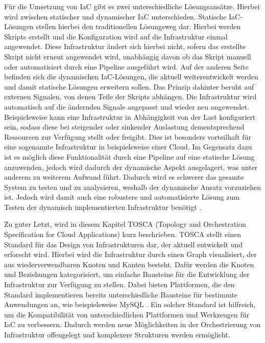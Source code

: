 \documentclass[biblatex]{lni}
\begin{document}
Für die Umsetzung von IaC gibt es zwei unterschiedliche Lösungsansätze. Hierbei wird zwischen statischer und dynamischer IaC unterschieden. Statische IaC-Lösungen stellen hierbei den traditionellen Lösungsweg dar. Hierbei werden Skripts erstellt und die Konfiguration wird auf die Infrastruktur einmal angewendet. Diese Infrastruktur ändert sich hierbei nicht, sofern das erstellte Skript nicht erneut angewendet wird, unabhängig davon ob das Skript manuell oder automatisiert durch eine Pipeline ausgeführt wird. Auf der anderen Seite befinden sich die dynamischen IaC-Lösungen, die aktuell weiterentwickelt werden und damit statische Lösungen erweitern sollen. Das Prinzip dahinter beruht auf externen Signalen, von denen Teile der Skripts abhängen. Die Infrastruktur wird automatisch auf die ändernden Signale angepasst und wieder neu angewendet. Beispielsweise kann eine Infrastruktur in Abhängigkeit von der Last konfiguriert sein, sodass diese bei steigender oder sinkender Auslastung dementsprechend Ressourcen zur Verfügung stellt oder freigibt. Dies ist besonders vorteilhaft für eine sogenannte  Infrastruktur in beispielsweise einer Cloud. Im Gegensatz dazu ist es möglich diese Funktionalität durch eine Pipeline auf eine statische Lösung anzuwenden, jedoch wird dadurch der dynamische Aspekt ausgelagert, was unter anderem zu weiterem Aufwand führt. Dadurch wird es schwerer das gesamte System zu testen und zu analysieren, weshalb der dynamische Ansatz vorzuziehen ist. Jedoch wird damit auch eine robustere und automatisierte Lösung zum Testen der dynamisch implementierten Infrastruktur benötigt \cite{Sokolowski.2022}.

Zu guter Letzt, wird in diesem Kapitel TOSCA (Topology and Orchestration Specification for Cloud Applications) kurz beschrieben. TOSCA stellt einen Standard für das Design von Infrastrukturen dar, der aktuell entwickelt und erforscht wird. Hierbei wird die Infrastruktur durch einen Graph visualisiert, der aus wiederverwendbaren Knoten und Kanten besteht. Dafür werden die Knoten und Beziehungen kategorisiert, um einfache Bausteine für die Entwicklung der Infrastruktur zur Verfügung zu stellen. Dabei bieten Plattformen, die den Standard implementieren bereits unterschiedliche Bausteine für bestimmte Anwendungen an, wie beispielsweise MySQL \cite{Artac.2017}. Ein solcher Standard ist hilfreich, um die Kompatibilität von unterschiedlichen Plattformen und Werkzeugen für IaC zu verbessern. Dadurch werden neue Möglichkeiten in der Orchestrierung von Infrastruktur offengelegt und komplexere Strukturen werden ermöglicht.
\end{document}
